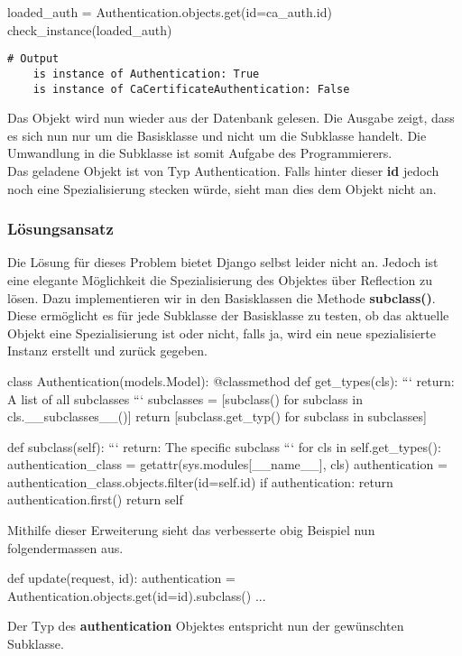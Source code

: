\begin{python}
    loaded_auth = Authentication.objects.get(id=ca_auth.id)
    check_instance(loaded_auth)
\end{python}
\begin{lstlisting}[style=BashInputStyle]
    # Output
    is instance of Authentication: True
    is instance of CaCertificateAuthentication: False
\end{lstlisting} 
Das Objekt wird nun wieder aus der Datenbank gelesen. Die Ausgabe zeigt, dass es sich nun nur um die Basisklasse und nicht um die Subklasse handelt. Die Umwandlung in die Subklasse ist somit Aufgabe des Programmierers.\\
Das geladene Objekt ist von Typ Authentication. Falls hinter dieser \textbf{id} jedoch noch eine Spezialisierung stecken würde, sieht man dies dem Objekt nicht an.


\subsubsection{Lösungsansatz}
Die Lösung für dieses Problem bietet Django selbst leider nicht an. Jedoch ist eine elegante Möglichkeit die Spezialisierung des Objektes über Reflection zu lösen. Dazu implementieren wir in den Basisklassen die Methode \textbf{subclass()}.\\
Diese ermöglicht es für jede Subklasse der Basisklasse zu testen, ob das aktuelle Objekt eine Spezialisierung ist oder nicht, falls ja, wird ein neue spezialisierte Instanz erstellt und zurück gegeben.
\medskip
\begin{python}
class Authentication(models.Model):
    @classmethod
    def get_types(cls):
        ```
        return: A list of all subclasses
        ```
        subclasses = [subclass() for subclass in cls.__subclasses__()]
        return [subclass.get_typ() for subclass in subclasses]	
	
    def subclass(self):
        ```
        return: The specific subclass 
        ```
        for cls in self.get_types():
            authentication_class = getattr(sys.modules[__name__], cls)
            authentication = authentication_class.objects.filter(id=self.id)
            if authentication:
                return authentication.first()
        return self
\end{python}
\medskip
Mithilfe dieser Erweiterung sieht das verbesserte obig Beispiel nun folgendermassen aus.
\medskip
\begin{python}
def update(request, id):
    authentication = Authentication.objects.get(id=id).subclass()
    ...
\end{python}
\medskip
Der Typ des \textbf{authentication} Objektes entspricht nun der gewünschten Subklasse.\\\\


